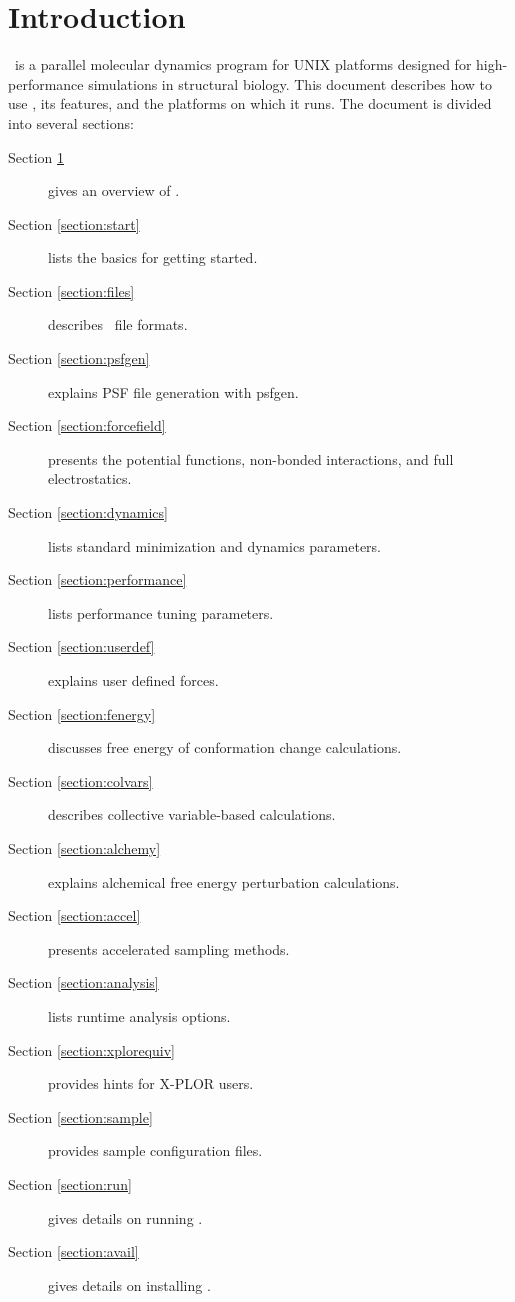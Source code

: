 

\section{Introduction}
\label{section:intro}

\NAMD\ is a parallel molecular dynamics program for UNIX 
platforms designed for high-performance 
simulations in structural biology.  This document describes how to use 
\NAMD, its features, and the platforms on which it runs.
The document is divided into several sections:
\begin{description}
\item[Section \ref{section:intro}] gives an overview of \NAMD.
\item[Section \ref{section:start}] lists the basics for getting started.
\item[Section \ref{section:files}] describes \NAMD\ file formats.
\item[Section \ref{section:psfgen}] explains PSF file generation with psfgen.
\item[Section \ref{section:forcefield}] presents the potential functions,
non-bonded interactions, and full electrostatics.
\item[Section \ref{section:dynamics}] lists standard minimization
and dynamics parameters.
\item[Section \ref{section:performance}] lists performance tuning parameters.
\item[Section \ref{section:userdef}] explains user defined forces.
\item[Section \ref{section:fenergy}] discusses free energy of
conformation change calculations.
\item[Section \ref{section:colvars}] describes collective
variable-based calculations.
\item[Section \ref{section:alchemy}] explains alchemical free energy
perturbation calculations.
\item[Section \ref{section:accel}] presents accelerated sampling methods.
\item[Section \ref{section:analysis}] lists runtime analysis options.
\item[Section \ref{section:xplorequiv}] provides hints for X-PLOR users.
\item[Section \ref{section:sample}] provides sample configuration files.
\item[Section \ref{section:run}] gives details on running \NAMD.
\item[Section \ref{section:avail}] gives details on installing \NAMD.
\end{description}


